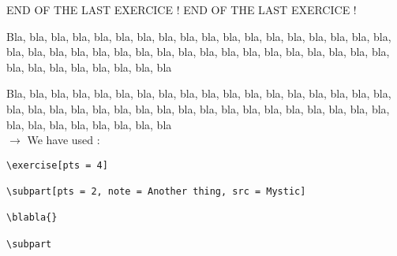 \documentclass[12pt]{article}
\newcommand\blabla{%
		\noindent Bla, bla, bla, bla, bla, bla, bla, bla, bla, bla, bla,
		bla, bla, bla, bla, bla, bla, bla, bla, bla, bla, bla,
		bla, bla, bla, bla, bla, bla, bla, bla, bla, bla, bla,
		bla, bla, bla, bla, bla, bla, bla, bla, bla, bla, bla
	}
\newcommand\codeused{
		\blabla{} \medskip  \\ \noindent $\rightarrow$ We have used :
	}
\begin{document}
\newpage \medskip \noindent END OF THE LAST EXERCICE ! END OF THE LAST EXERCICE !

\exercise[pts = 4]
      
\subpart[pts = 2, note = Another thing, src = Mystic]

\blabla{}

\subpart

\codeused{}

\begin{verbatim}
\exercise[pts = 4]
      
\subpart[pts = 2, note = Another thing, src = Mystic]

\blabla{}

\subpart
\end{verbatim}
\end{document}
